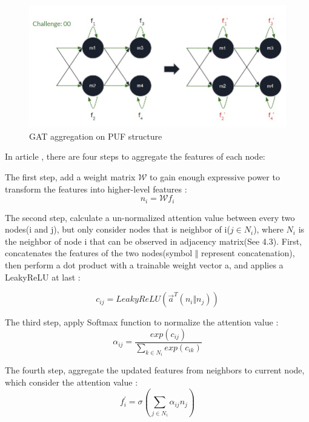\begin{figure}[htp]
    \centering
    \includegraphics[width=16cm]{figures/figure12.jpg}
    \caption{GAT aggregation on PUF structure}
    \label{fig:figure12}
    \end{figure}

In article \cite{Reference10}, there are four steps to aggregate the features of each node:

The first step, add a weight matrix $\mathcal{W}$ to gain enough expressive power to transform the features into higher-level features \cite{Reference10}:
\begin{equation}
    n_i = \mathcal{W}f_i
\end{equation}

The second step, calculate a un-normalized attention value between every two nodes(i and j), but only consider nodes that is neighbor of i($j \in N_i$), where $N_i$ is the neighbor of node i that can be observed in 
adjacency matrix(See 4.3). First, concatenates the features of the two nodes(symbol $\Vert$ represent concatenation), then perform a dot product with a trainable weight vector a, and applies a LeakyReLU at last \cite{Reference10}:

\begin{equation}
    c_{ij} = LeakyReLU(\overrightarrow{a}^T(n_i \Vert n_j))
\end{equation}

The third step, apply Softmax function to normalize the attention value \cite{Reference10}:
\begin{equation}
    \alpha_{ij} = \frac{exp(c_{ij})}{\sum_{k \in N_i}  exp(c_{ik})} 
\end{equation}

The fourth step, aggregate the updated features from neighbors to current node, which consider the attention value \cite{Reference10}:
\begin{equation}
    f_i^{'} = \sigma (\sum_{j \in N_i} \alpha_{ij}n_j)
\end{equation}

